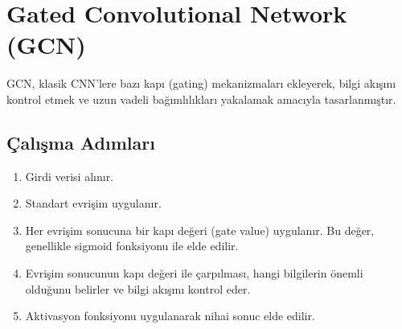 \section{Gated Convolutional Network (GCN)}
GCN, klasik CNN'lere bazı kapı (gating) mekanizmaları ekleyerek, bilgi akışını kontrol etmek ve uzun vadeli bağımlılıkları yakalamak amacıyla tasarlanmıştır. 

\subsection{Çalışma Adımları}
\begin{enumerate}
	\item Girdi verisi alınır.
	\item Standart evrişim uygulanır.
	\item Her evrişim sonucuna bir kapı değeri (gate value) uygulanır. Bu değer, genellikle sigmoid fonksiyonu ile elde edilir.
	\item Evrişim sonucunun kapı değeri ile çarpılması, hangi bilgilerin önemli olduğunu belirler ve bilgi akışını kontrol eder.
	\item Aktivasyon fonksiyonu uygulanarak nihai sonuc elde edilir.
\end{enumerate}

\newpage